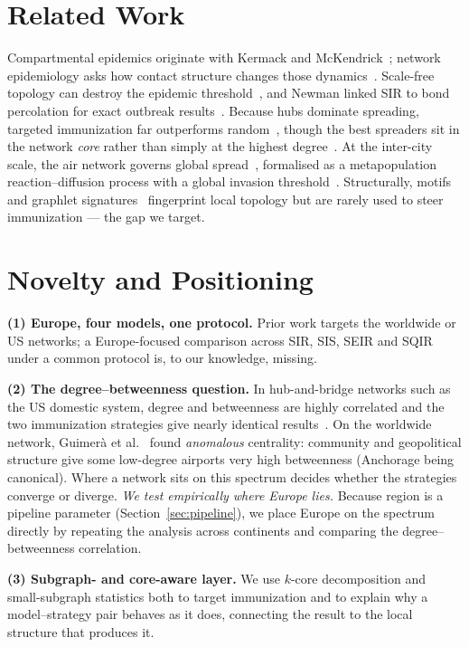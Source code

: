 \documentclass{sigkddExp}
\begin{document}
\section{Related Work}
Compartmental epidemics originate with Kermack and
McKendrick~\cite{kermack:sir}; network epidemiology asks how contact
structure changes those dynamics~\cite{pastorsatorras:review,keeling:networks}.
Scale-free topology can destroy the epidemic
threshold~\cite{pastorsatorras:scalefree}, and Newman linked SIR to bond
percolation for exact outbreak results~\cite{newman:spread}. Because hubs
dominate spreading, targeted immunization far outperforms
random~\cite{pastorsatorras:immunization,cohen:immunization}, though the
best spreaders sit in the network \emph{core} rather than simply at the
highest degree~\cite{kitsak:spreaders}. At the inter-city scale, the air
network governs global spread~\cite{colizza:airline,balcan:multiscale},
formalised as a metapopulation reaction--diffusion process with a global
invasion threshold~\cite{colizza:reactiondiffusion,colizza:invasion}.
Structurally, motifs~\cite{milo:motifs} and graphlet
signatures~\cite{przulj:graphlets} fingerprint local topology but are
rarely used to steer immunization --- the gap we target.

\section{Novelty and Positioning}
\label{sec:novelty}
\textbf{(1) Europe, four models, one protocol.} Prior work targets the
worldwide or US networks; a Europe-focused comparison across SIR, SIS,
SEIR and SQIR under a common protocol is, to our knowledge, missing.

\textbf{(2) The degree--betweenness question.} In hub-and-bridge networks
such as the US domestic system, degree and betweenness are highly
correlated and the two immunization strategies give nearly identical
results~\cite{sun:anomalous}.
On the worldwide network, Guimer{\`a} et al.~\cite{guimera:anomalous} found
\emph{anomalous} centrality: community and geopolitical structure give some
low-degree airports very high betweenness (Anchorage being canonical).
Where a network sits on this spectrum decides whether the strategies
converge or diverge. \emph{We test empirically where Europe lies.} Because
region is a pipeline parameter (Section~\ref{sec:pipeline}), we place
Europe on the spectrum directly by repeating the analysis across continents
and comparing the degree--betweenness correlation.

\textbf{(3) Subgraph- and core-aware layer.} We use $k$-core decomposition
and small-subgraph statistics both to target immunization and to explain
why a model--strategy pair behaves as it does, connecting the result to the
local structure that produces it.
\end{document}
